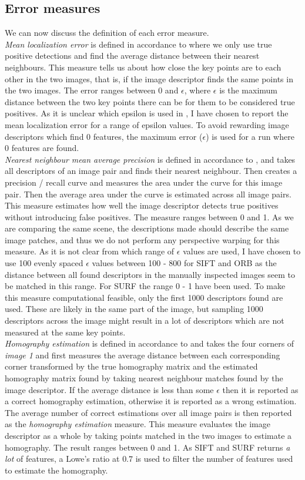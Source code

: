 \subsection{Error measures}
We can now discuss the definition of each error measure.\\
\textit{Mean localization error} is defined in accordance to \cite{sp} where we only use true positive detections and find the average distance between their nearest neighbours. This measure tells us about how close the key points are to each other in the two images, that is, if the image descriptor finds the same points in the two images. The error ranges between 0 and $\epsilon$, where $\epsilon$ is the maximum distance between the two key points there can be for them to be considered true positives. As it is unclear which epsilon is used in \cite{sp}, I have chosen to report the mean localization error for a range of epsilon values. To avoid rewarding image descriptors which find 0 features, the maximum error ($\epsilon$) is used for a run where 0 features are found.\\
\textit{Nearest neighbour mean average precision} is defined in accordance to \cite{sp}, and takes all descriptors of an image pair and finds their nearest neighbour. Then creates a precision / recall curve and measures the area under the curve for this image pair. Then the average area under the curve is estimated across all image pairs. This measure estimates how well the image descriptor detects true positives without introducing false positives. The measure ranges between 0 and 1. As we are comparing the same scene, the descriptions made should describe the same image patches, and thus we do not perform any perspective warping for this measure. As it is not clear from \cite{sp} which range of $\epsilon$ values are used, I have chosen to use 100 evenly spaced $\epsilon$ values between 100 - 800 for SIFT and ORB as the distance between all found descriptors in the manually inspected images seem to be matched in this range. For SURF the range 0 - 1 have been used. To make this measure computational feasible, only the first 1000 descriptors found are used. These are likely in the same part of the image, but sampling 1000 descriptors across the image might result in a lot of descriptors which are not measured at the same key points.\\
\textit{Homography estimation} is defined in accordance to \cite{sp} and takes the four corners of \textit{image 1} and first measures the average distance between each corresponding corner transformed by the true homography matrix and the estimated homography matrix found by taking nearest neighbour matches found by the image descriptor. If the average distance is less than some $\epsilon$ then it is reported as a correct homography estimation, otherwise it is reported as a wrong estimation. The average number of correct estimations over all image pairs is then reported as the \textit{homography estimation} measure. This measure evaluates the image descriptor as a whole by taking points matched in the two images to estimate a homography. The result ranges between 0 and 1. As SIFT and SURF returns \textit{a lot} of features, a Lowe's ratio at $0.7$ is used to filter the number of features used to estimate the homography.